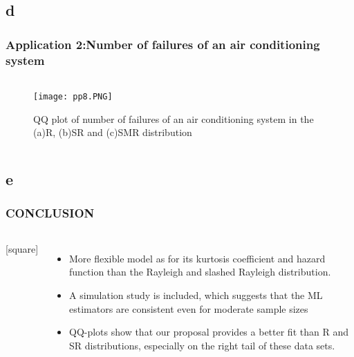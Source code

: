 \documentclass{beamer}
\begin{document}
\subsection{d}
\begin{frame}
\frametitle{Application 2:Number of failures of an air conditioning system}
\footnotesize
\label{d}
\begin{columns}

\begin{column}{\textwidth}
\begin{figure}[h]
\renewcommand{\theenumi}{1}
\centering
\texttt{[image: pp8.PNG]}
\caption{QQ plot of number of failures of an air conditioning system in the (a)R, (b)SR and (c)SMR distribution }
\label{Fig:2}
\end{figure}
\end{column}
\end{columns}
\end{frame}

\subsection{e}
\begin{frame}
\frametitle{CONCLUSION}
\footnotesize
\label{e}
\begin{columns}
[square]
  \begin{itemize}
  \item More flexible model as for its kurtosis coefficient and hazard function than the Rayleigh and slashed
Rayleigh distribution.
  \item A simulation study is included, which suggests that the ML
estimators are consistent even for moderate sample sizes
  \item QQ-plots show that our proposal provides a better fit than R and SR distributions,
especially on the right tail of these data sets.
  \end{itemize}
  \end{columns}
\end{frame}
\end{document}
